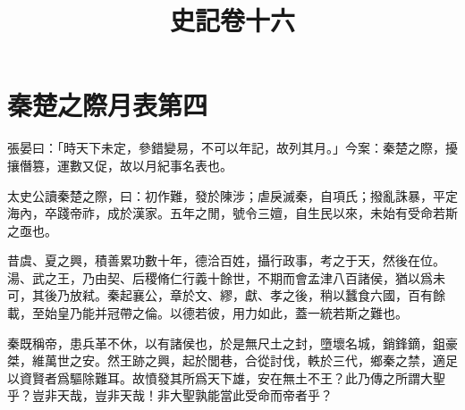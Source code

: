 \documentclass{ltc-cn-vbook}
\begin{document}
\title{史記卷十六}
\chapter{秦楚之際月表第四}
\setcounter{page}{915}

\begin{正文}


\begin{段落}[indent=3]
張晏曰：「時天下未定，參錯變易，不可以年記，故列其月。」今案：秦楚之際，擾攘僭篡，運數又促，故以月紀事名表也。
\end{段落}

太史公讀秦楚之際，曰：初作難，發於陳涉；虐戾滅秦，自項氏；撥亂誅暴，平定海內，卒踐帝祚，成於漢家。五年之閒，號令三嬗，自生民以來，未始有受命若斯之亟也。


昔虞、夏之興，積善累功數十年，德洽百姓，攝行政事，考之于天，然後在位。湯、武之王，乃由契、后稷脩仁行義十餘世，不期而會孟津八百諸侯，猶以爲未可，其後乃放弒。秦起襄公，章於文、繆，獻、孝之後，稍以蠶食六國，百有餘載，至始皇乃能并冠帶之倫。以德若彼，用力如此，蓋一統若斯之難也。


秦既稱帝，患兵革不休，以有諸侯也，於是無尺土之封，墮壞名城，銷鋒鏑，鉏豪桀，維萬世之安。然王跡之興，起於閭巷，合從討伐，軼於三代，鄉秦之禁，適足以資賢者爲驅除難耳。故憤發其所爲天下雄，安在無土不王？此乃傳之所謂大聖乎？豈非天哉，豈非天哉！非大聖孰能當此受命而帝者乎？


\end{正文}
\end{document}

